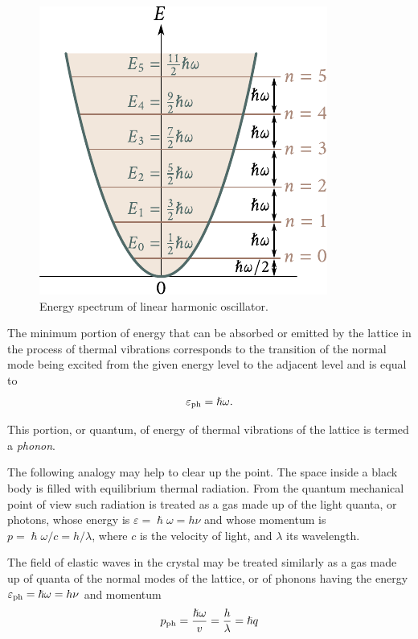 \begin{figure}[t]
	\begin{center}
		\includegraphics[scale=1]{figures/ch_04/fig_4_3.pdf}
		\caption[]{Energy spectrum of linear harmonic oscillator.}
		\label{fig:4_3}
	\end{center}
	\vspace{-0.7cm}
\end{figure}

The minimum portion of energy that can be absorbed or emitted by the lattice in the process of thermal vibrations corresponds to the transition of the normal mode being excited from the given energy level to the adjacent level and is equal to
\begin{equation}\label{eq:4_16}
    \varepsilon_{\text{ph}} = \hslash \omega.
\end{equation}

\noindent
This portion, or quantum, of energy of thermal vibrations of the lattice is termed a \textit{phonon}.

The following analogy may help to clear up the point. The space inside a black body is filled with equilibrium thermal radiation. From the quantum mechanical point of view such radiation is treated as a gas made up of the light quanta, or photons, whose energy is $\varepsilon= \hslash\omega=h\nu$ and whose momentum is $p=\hslash\omega/c=h/\lambda$, where $c$ is the velocity of light, and $\lambda$ its wavelength.

The field of elastic waves in the crystal may be treated similarly as a gas made up of quanta of the normal modes of the lattice, or of phonons having the energy $\varepsilon_{\text{ph}}=\hslash\omega=h\nu$ and momentum
\begin{equation}\label{eq:4_17}
    p_{\text{ph}} = \frac{\hslash \omega}{v} = \frac{h}{\lambda} = \hslash q
\end{equation}

